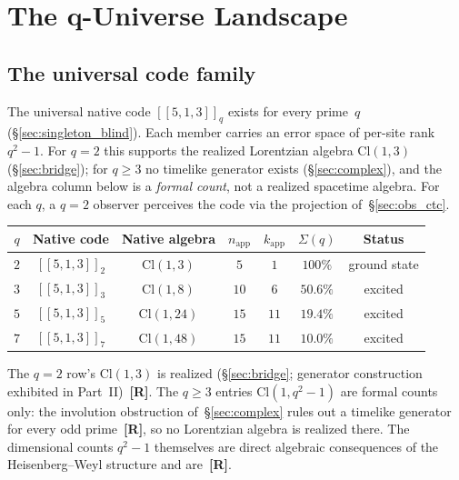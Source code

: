 \documentclass[11pt,a4paper]{article}
\newcommand{\Rmark}{\textcolor{green!50!black}{\textbf{[R]}}}
\newcommand{\Cq}[4]{[\![#1,#2,#3]\!]_{#4}}
\providecommand{\Cl}[1]{\mathrm{Cl}(#1)}
\newcommand{\nApp}{n_{\mathrm{app}}}
\newcommand{\kApp}{k_{\mathrm{app}}}
\begin{document}
\section{The q-Universe Landscape}
\label{sec:landscape}

\subsection{The universal code family}
\label{sec:univ_family}

The universal native code $\Cq{5}{1}{3}{q}$ exists for every prime~$q$ (\S\ref{sec:singleton_blind}). Each member carries an error space of per-site rank $q^2-1$. For $q=2$ this supports the realized Lorentzian algebra $\Cl{1,3}$ (\S\ref{sec:bridge}); for $q\geq3$ no timelike generator exists (\S\ref{sec:complex}), and the algebra column below is a \emph{formal count}, not a realized spacetime algebra. For each $q$, a $q=2$ observer perceives the code via the projection of~\S\ref{sec:obs_ctc}.

\begin{center}
\renewcommand{\arraystretch}{1.25}
\begin{tabular}{ccccccc}
\toprule
$q$ & Native code & Native algebra & $\nApp$ & $\kApp$ & $\Sigma(q)$ & Status \\
\midrule
$2$ & $\Cq{5}{1}{3}{2}$ & $\Cl{1,3}$  & $5$  & $1$  & $100\%$  & ground state \\
$3$ & $\Cq{5}{1}{3}{3}$ & $\Cl{1,8}$  & $10$ & $6$  & $50.6\%$ & excited \\
$5$ & $\Cq{5}{1}{3}{5}$ & $\Cl{1,24}$ & $15$ & $11$ & $19.4\%$ & excited \\
$7$ & $\Cq{5}{1}{3}{7}$ & $\Cl{1,48}$ & $15$ & $11$ & $10.0\%$ & excited \\
\bottomrule
\end{tabular}
\end{center}

The $q=2$ row's $\Cl{1,3}$ is realized (\S\ref{sec:bridge}; generator construction exhibited in Part~II)~\Rmark. The $q\geq3$ entries $\Cl{1,q^2-1}$ are formal counts only: the involution obstruction of~\S\ref{sec:complex} rules out a timelike generator for every odd prime~\Rmark, so no Lorentzian algebra is realized there. The dimensional counts $q^2-1$ themselves are direct algebraic consequences of the Heisenberg--Weyl structure and are~\Rmark.
\end{document}
